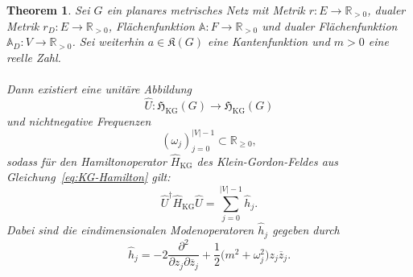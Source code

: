 \documentclass[11pt,a4paper,leqno]{report}
\newtheorem{theorem}{Theorem}[chapter]
\numberwithin{equation}{chapter}
\begin{document}
\begin{theorem}\label{thm:KG-Hamilton-Spektral}
	Sei $G$ ein planares metrisches Netz mit Metrik
	$r:E\to\mathbb R_{>0}$, dualer Metrik
	$r_D:E\to\mathbb R_{>0}$, Flächenfunktion
	$\mathbb A:F\to\mathbb R_{>0}$ und dualer Flächenfunktion
	$\mathbb A_D:V\to\mathbb R_{>0}$.
	Sei weiterhin $a\in\mathfrak K(G)$ eine Kantenfunktion und
	$m>0$ eine reelle Zahl.
	\\
	\\
	Dann existiert eine unitäre Abbildung
	\[
	\hat U:\mathfrak H_{\mathrm{KG}}(G)\to\mathfrak H_{\mathrm{KG}}(G)
	\]
	und nichtnegative Frequenzen
	\[
	(\omega_j)_{j=0}^{|V|-1}\subset\mathbb R_{\ge0},
	\]
	sodass für den Hamiltonoperator
	$\hat H_{\mathrm{KG}}$ des Klein-Gordon-Feldes aus
	Gleichung~\eqref{eq:KG-Hamilton} gilt:
	\begin{equation}\label{eq:KG-Hamilton-diagonal}
		\hat U^\dagger\hat H_{\mathrm{KG}}\hat U
		=
		\sum_{j=0}^{|V|-1}\hat h_j.
	\end{equation}
	Dabei sind die eindimensionalen Modenoperatoren $\hat h_j$ gegeben durch
	\begin{equation}\label{eq:KG-hj-Wirtinger}
		\hat h_j
		=
		-2\frac{\partial^2}{\partial z_j\partial\overline z_j}
		+
		\frac12\bigl(m^2+\omega_j^2\bigr)z_j\overline z_j.
	\end{equation}
\end{theorem}
\end{document}
